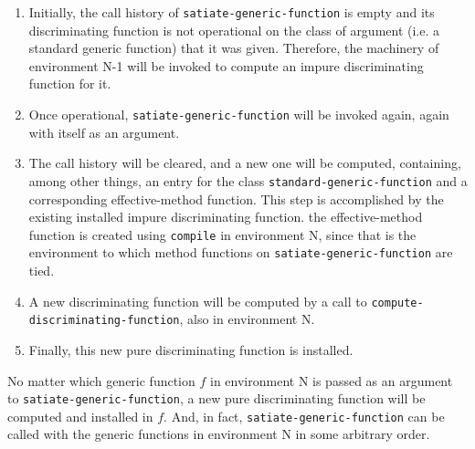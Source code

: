 \begin{enumerate}
\item Initially, the call history of \texttt{satiate-generic-function}
  is empty and its discriminating function is not operational on the
  class of argument (i.e. a standard generic function) that it was
  given.  Therefore, the machinery of environment N-1 will be invoked
  to compute an impure discriminating function for it.
\item Once operational, \texttt{satiate-generic-function} will be
  invoked again, again with itself as an argument.
\item The call history will be cleared, and a new one will be
  computed, containing, among other things, an entry for the class
  \texttt{standard-generic-function} and a corresponding
  effective-method function.  This step is accomplished by the
  existing installed impure discriminating function.  the
  effective-method function is created using \texttt{compile} in
  environment N, since that is the environment to which method
  functions on \texttt{satiate-generic-function} are tied.
\item A new discriminating function will be computed by a call to
  \texttt{compute-discriminating-function}, also in environment N.
\item Finally, this new pure discriminating function is installed.
\end{enumerate}

No matter which generic function $f$ in environment N is passed as an
argument to \texttt{satiate-generic-function}, a new pure
discriminating function will be computed and installed in $f$.  And,
in fact, \texttt{satiate-generic-function} can be called with the
generic functions in environment N in some arbitrary order.
